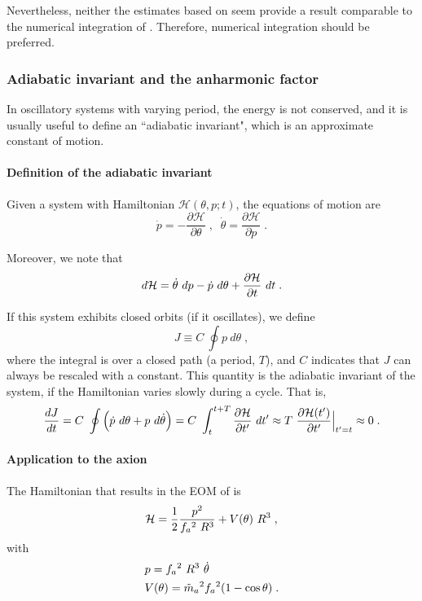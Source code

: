 \documentclass[11pt,a4paper]{article}
\begin{document}
Nevertheless, neither the estimates based on  seem provide a result comparable to the numerical integration of . Therefore, numerical integration should be preferred. 

\subsubsection{Adiabatic invariant and the anharmonic factor}\label{sec:an_fac}
%
In oscillatory systems with varying period, the energy is not conserved, and it is usually useful to define an ``adiabatic invariant", which is an approximate constant of motion.

\paragraph{Definition of the adiabatic invariant}
%
Given a system with Hamiltonian $\mathcal{H}(\theta,p;t)$, the equations of motion are 
%
\begin{equation}
	\dot p = - \dfrac{\partial \mathcal{H}}{\partial \theta} \;, \;\; 
	\dot \theta =  \dfrac{\partial \mathcal{H}}{\partial p} \;.
	\label{eq:hamiltonian_eoms}
\end{equation}

Moreover, we note that
%
\begin{equation}
	d \mathcal{H} = \dot \theta \ d p - \dot p \ d \theta + \dfrac{\partial \mathcal{H}}{\partial t} \ d t \;.  
	\label{eq:total_dH}
\end{equation}


If this system exhibits closed orbits (\eg if it oscillates), we define 
%
\begin{equation}
	J \equiv C \ \oint p \ d \theta \;,
	\label{eq:adiabatic_inv_def}
\end{equation}
%
where the integral is over a closed path (\eg a period, $T$), and $C$ indicates that $J$ can always be rescaled with a constant. This quantity is the adiabatic invariant of the system, if the Hamiltonian varies slowly during a cycle. That is,
%
\[
\dfrac{d J}{d t} = C \ \oint \lrBigb{\dot p \ d \theta + p \ d \dot \theta} = C \ \dint_{t}^{t+T}  \dfrac{\partial \Ham}{\partial t^\prime} \ d t^\prime \approx T \ \dfrac{\partial \Ham(t^{\prime})}{\partial t^{\prime}}\Big|_{t^{\prime}=t} \approx 0 
\;. 
\]
%




\paragraph{Application to the axion}
%
The Hamiltonian that results in the EOM of  is
%
\begin{equation}
	\mathcal{H} = \dfrac{1}{2} \dfrac{p^2}{f_{a}{}^2 \ R^3} + V(\theta) \ R^3\;,
	\label{eq:axion_H}
\end{equation}
%
with 
%
\begin{eqnarray}
	& p = f_{a}{}^2 \ R^3 \ \dot \theta \\
	\label{eq:momentum}
	& V(\theta) = \tilde m_{a}{}^2 f_{a}{}^2 (1-\cos \theta) \;.
	\label{eq:potential}
\end{eqnarray}
\end{document}
